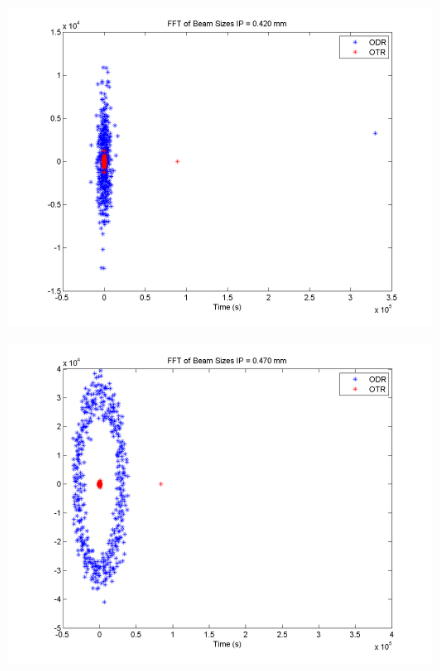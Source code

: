 \documentclass[12pt]{article}
\begin{document}
\begin{figure}
\begin{center}
\includegraphics[scale=0.5]{Figures/FFT_420.PNG}
\caption{}
\end{center}
\end{figure}

\begin{figure}
\begin{center}
\includegraphics[scale=0.5]{Figures/FFT_470.PNG}
\caption{}
\end{center}
\end{figure}
\end{document}
